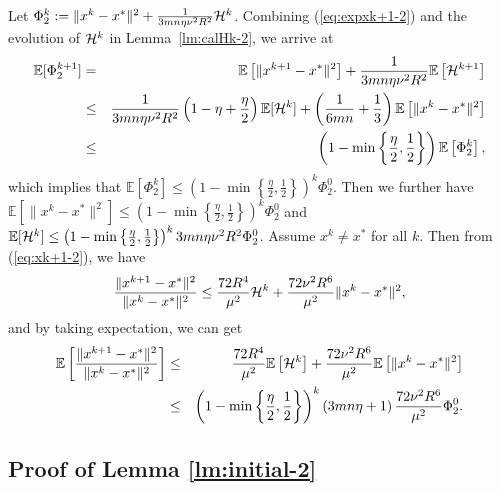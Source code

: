 \documentclass[12pt]{article}
\newcommand{\eqdef}{\; { := }\;}
\newcommand{\ExpBr}[1]{\mathbb{E}\left[#1\right]}
\begin{document}
Let $\Phi_2^k \eqdef \|x^{k} - x^*\|^2 + \frac{1}{3mn\eta  \nu^2 R^2} {\cal H}^{k}$. Combining (\ref{eq:expxk+1-2}) and the evolution of ${\cal H}^k$ in Lemma~\ref{lm:calHk-2}, we arrive at 
\begin{eqnarray*}
	\mathbb{E}[\Phi_2^{k+1}] &=& \ExpBr{\|x^{k+1} - x^*\|^2} + \frac{1}{3mn\eta  \nu^2 R^2}  \ExpBr{{\cal H}^{k+1}} \\ 
	&\leq&  \frac{1}{3mn \eta \nu^2 R^2} \left(  1 - \eta + \frac{\eta}{2}  \right) \mathbb{E}[{\cal H}^k] + \left(  \frac{1}{6mn} + \frac{1}{3}  \right)\ExpBr{\|x^k - x^*\|^2 }\\ 
	&\leq& \left(  1 - \min \left\{  \frac{\eta}{2}, \frac{1}{2}  \right\}  \right) \ExpBr{\Phi_2^k}, 
\end{eqnarray*}
which implies that $\ExpBr{\Phi_2^k}\leq  \left(  1 - \min \left\{  \frac{\eta}{2}, \frac{1}{2}  \right\}  \right)^k \Phi_2^0$. Then we further have $\ExpBr{\|x^k - x^*\|^2} \leq  \left(  1 - \min \left\{  \frac{\eta}{2}, \frac{1}{2}  \right\}  \right)^k \Phi_2^0$ and $\mathbb{E}[{\cal H}^k] \leq  \left(  1 - \min \left\{  \frac{\eta}{2}, \frac{1}{2}  \right\}  \right)^k 3mn\eta \nu^2 R^2 \Phi_2^0$. Assume $x^k \neq x^*$ for all $k$. Then from (\ref{eq:xk+1-2}), we have 
$$
\frac{\|x^{k+1} - x^*\|^2}{\|x^k - x^*\|^2 } \leq \frac{72R^4}{ \mu^2} {\cal H}^k + \frac{72 \nu^2 R^6}{\mu^2}\|x^k - x^*\|^2, 
$$
and by taking expectation, we can get 
\begin{eqnarray*}
	\mathbb{E} \left[  \frac{\|x^{k+1} - x^*\|^2}{\|x^k - x^*\|^2 }  \right] &\leq& \frac{72R^4}{ \mu^2}\ExpBr{{\cal H}^k} + \frac{72 \nu^2 R^6}{\mu^2} \ExpBr{\|x^k - x^*\|^2} \\ 
	&\leq& \left(  1 - \min \left\{  \frac{\eta}{2}, \frac{1}{2}  \right\}  \right)^k  \left(  {3mn\eta} + 1  \right) \frac{72\nu^2 R^6}{\mu^2} \Phi_2^0. 
\end{eqnarray*}




\subsection{Proof of Lemma \ref{lm:initial-2}}
\end{document}
